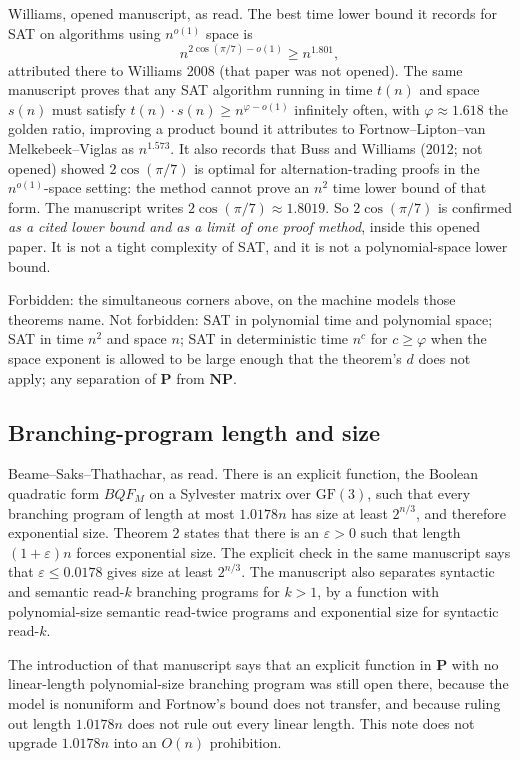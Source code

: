 \documentclass[11pt]{article}
\begin{document}
Williams, opened manuscript, as read. The best time lower bound it records for SAT on algorithms using \(n^{o(1)}\) space is
\[
n^{2\cos(\pi/7)-o(1)}\ge n^{1.801},
\]
attributed there to Williams 2008 (that paper was not opened). The same manuscript proves that any SAT algorithm running in time \(t(n)\) and space \(s(n)\) must satisfy \(t(n)\cdot s(n)\ge n^{\varphi-o(1)}\) infinitely often, with \(\varphi\approx 1.618\) the golden ratio, improving a product bound it attributes to Fortnow--Lipton--van Melkebeek--Viglas as \(n^{1.573}\). It also records that Buss and Williams (2012; not opened) showed \(2\cos(\pi/7)\) is optimal for alternation-trading proofs in the \(n^{o(1)}\)-space setting: the method cannot prove an \(n^2\) time lower bound of that form. The manuscript writes \(2\cos(\pi/7)\approx 1.8019\). So \(2\cos(\pi/7)\) is confirmed \emph{as a cited lower bound and as a limit of one proof method}, inside this opened paper. It is not a tight complexity of SAT, and it is not a polynomial-space lower bound.

Forbidden: the simultaneous corners above, on the machine models those theorems name. Not forbidden: SAT in polynomial time and polynomial space; SAT in time \(n^{2}\) and space \(n\); SAT in deterministic time \(n^{c}\) for \(c\ge \varphi\) when the space exponent is allowed to be large enough that the theorem's \(d\) does not apply; any separation of \(\mathbf{P}\) from \(\mathbf{NP}\).

\subsection*{Branching-program length and size}
Beame--Saks--Thathachar, as read. There is an explicit function, the Boolean quadratic form \(BQF_M\) on a Sylvester matrix over \(\mathrm{GF}(3)\), such that every branching program of length at most \(1.0178n\) has size at least \(2^{n/3}\), and therefore exponential size. Theorem 2 states that there is an \(\varepsilon>0\) such that length \((1+\varepsilon)n\) forces exponential size. The explicit check in the same manuscript says that \(\varepsilon\le 0.0178\) gives size at least \(2^{n/3}\). The manuscript also separates syntactic and semantic read-\(k\) branching programs for \(k>1\), by a function with polynomial-size semantic read-twice programs and exponential size for syntactic read-\(k\).

The introduction of that manuscript says that an explicit function in \(\mathbf{P}\) with no linear-length polynomial-size branching program was still open there, because the model is nonuniform and Fortnow's bound does not transfer, and because ruling out length \(1.0178n\) does not rule out every linear length. This note does not upgrade \(1.0178n\) into an \(O(n)\) prohibition.
\end{document}
